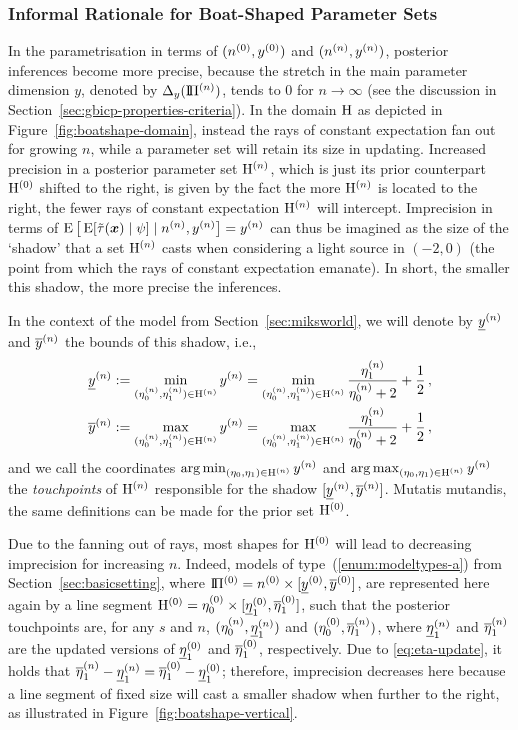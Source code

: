 \subsubsection{Informal Rationale for Boat-Shaped Parameter Sets}
\label{boatshape-rationale}

In the parametrisation in terms of $(n^{(0)},y^{(0)})$ and $(n^{(n)}, y^{(n)})$,
posterior inferences become more precise,
because the stretch in the main parameter dimension $y$, denoted by $\Delta_y(\text{I}\!\Pi^{(n)})$,
tends to $0$ for $n \to \infty$ (see the discussion in Section~\ref{sec:gbicp-properties-criteria}).
In the domain $\mathrm{H}$ as depicted in Figure~\ref{fig:boatshape-domain},
instead the rays of constant expectation fan out for growing $n$, %
while a parameter set will retain its size in updating.
Increased precision in a posterior parameter set $\mathrm{H}^{(n)}$, which is just
its prior counterpart $\mathrm{H}^{(0)}$ shifted to the right,
is given by the fact the more $\mathrm{H}^{(n)}$ is located to the right,
the fewer rays of constant expectation $\mathrm{H}^{(n)}$ will intercept.
Imprecision in terms of $\operatorname{E}\big[\operatorname{E}[\tilde{\tau}({\bm x}) \mid \psi] \mid n^{(n)}, y^{(n)}\big] = y^{(n)}$
can thus be imagined as the size of the `shadow' that a set $\mathrm{H}^{(n)}$ casts
when considering a light source in $(-2,0)$ (the point from which the rays of constant expectation emanate).
In short, the smaller this shadow, the more precise the inferences.

In the context of the model from Section~\ref{sec:miksworld},
we will denote by $\underline{y}^{(n)}$ and $\overline{y}^{(n)}$ the bounds of this shadow,
i.e.,
\begin{align*}
\underline{y}^{(n)} &:= \min_{(\eta_0^{(n)},\eta_1^{(n)}) \in \mathrm{H}^{(n)}} y^{(n)} = \min_{(\eta_0^{(n)},\eta_1^{(n)}) \in \mathrm{H}^{(n)}} \frac{\eta_1^{(n)}}{\eta_0^{(n)}+2} + \frac{1}{2}\,, \\
\overline{y}^{(n)} &:= \max_{(\eta_0^{(n)},\eta_1^{(n)}) \in \mathrm{H}^{(n)}} y^{(n)} = \max_{(\eta_0^{(n)},\eta_1^{(n)}) \in \mathrm{H}^{(n)}} \frac{\eta_1^{(n)}}{\eta_0^{(n)}+2} + \frac{1}{2}\,,
\end{align*}
and we call the coordinates $\operatorname*{arg\,min}_{(\eta_0,\eta_1) \in \mathrm{H}^{(n)}} y^{(n)}$ and $\operatorname*{arg\,max}_{(\eta_0,\eta_1) \in \mathrm{H}^{(n)}} y^{(n)}$
the \emph{touchpoints} of $\mathrm{H}^{(n)}$ responsible for the shadow $[\underline{y}^{(n)}, \overline{y}^{(n)}]$.
Mutatis mutandis, the same definitions can be made for the prior set $\mathrm{H}^{(0)}$.

Due to the fanning out of rays, most shapes for $\mathrm{H}^{(0)}$ will lead to decreasing imprecision for increasing $n$.
Indeed, models of type~(\ref{enum:modeltypes-a}) from Section~\ref{sec:basicsetting},
where $\text{I}\!\Pi^{(0)} = n^{(0)} \times [\underline{y}^{(0)}, \overline{y}^{(0)}]$,
are represented here again by a line segment $\mathrm{H}^{(0)} = \eta_0^{(0)} \times [\underline{\eta}_1^{(0)},\overline{\eta}_1^{(0)}]$,
such that the posterior touchpoints are, for any $s$ and $n$, $(\eta_0^{(n)},\underline{\eta}_1^{(n)})$ and $(\eta_0^{(0)},\overline{\eta}_1^{(n)})$,
where $\underline{\eta}_1^{(n)}$ and $\overline{\eta}_1^{(n)}$ are the updated versions of $\underline{\eta}_1^{(0)}$ and $\overline{\eta}_1^{(0)}$, respectively.
Due to \eqref{eq:eta-update}, it holds that $\overline{\eta}_1^{(n)}-\underline{\eta}_1^{(n)} = \overline{\eta}_1^{(0)}-\underline{\eta}_1^{(0)}$;
therefore, imprecision decreases here because a line segment of fixed size
will cast a smaller shadow when further to the right,
as illustrated in Figure~\ref{fig:boatshape-vertical}.

